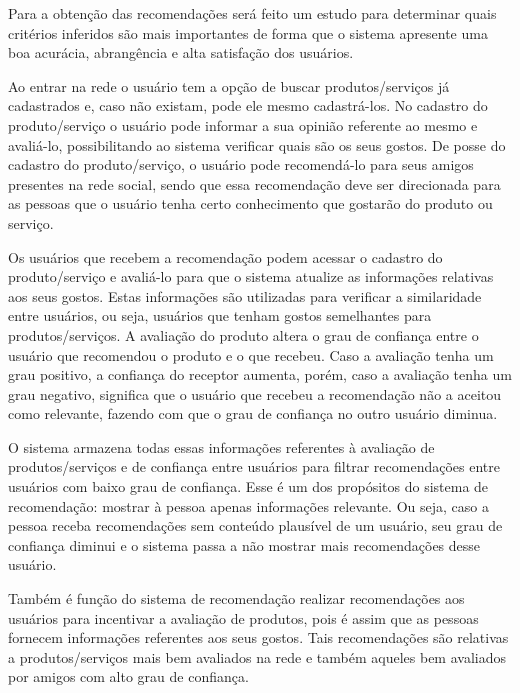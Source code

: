  Para a obtenção das recomendações será feito um estudo para determinar quais critérios inferidos são mais importantes de forma que o sistema apresente uma boa acurácia, abrangência e alta satisfação dos usuários.

 Ao entrar na rede o usuário tem a opção de buscar produtos/serviços já cadastrados e, caso não existam, pode ele mesmo cadastrá-los. No cadastro do produto/serviço o usuário pode informar a sua opinião referente ao mesmo e avaliá-lo, possibilitando ao sistema verificar quais são os seus gostos. De posse do cadastro do produto/serviço, o usuário pode recomendá-lo para seus amigos presentes na rede social, sendo que essa recomendação deve ser direcionada para as pessoas que o usuário tenha certo conhecimento que gostarão do produto ou serviço.

 Os usuários que recebem a recomendação podem acessar o cadastro do produto/serviço e avaliá-lo para que o sistema atualize as informações relativas aos seus gostos. Estas informações são utilizadas para verificar a similaridade entre usuários, ou seja, usuários que tenham gostos semelhantes para produtos/serviços. A avaliação do produto altera o grau de confiança entre o usuário que recomendou o produto e o que recebeu. Caso a avaliação tenha um grau positivo, a confiança do receptor aumenta, porém, caso a avaliação tenha um grau negativo, significa que o usuário que recebeu a recomendação não a aceitou como relevante, fazendo com que o grau de confiança no outro usuário diminua.

 O sistema armazena todas essas informações referentes à avaliação de produtos/serviços e de confiança entre usuários para filtrar recomendações entre usuários com baixo grau de confiança. Esse é um dos propósitos do sistema de recomendação: mostrar à pessoa apenas informações relevante. Ou seja, caso a pessoa receba recomendações sem conteúdo plausível de um usuário, seu grau de confiança diminui e o sistema passa a não mostrar mais recomendações desse usuário.

 Também é função do sistema de recomendação realizar recomendações aos usuários para incentivar a avaliação de produtos, pois é assim que as pessoas fornecem informações referentes aos seus gostos. Tais recomendações são relativas a produtos/serviços mais bem avaliados na rede e também aqueles bem avaliados por amigos com alto grau de confiança.

